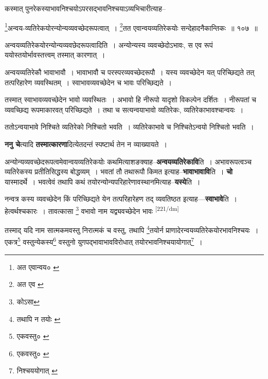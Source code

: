 \documentclass[article,12pt,a4paper]{memoir}
\begin{document}
	  \pstart कस्मात् पुनरेकस्याभावनिश्चयोऽपरसद्भावनिश्चयाऽव्यभिचारीत्याह--
	\pend
       

	  \pstart \footnote{अत एवान्वय० \cite{dp-msC}}अन्वय-व्यतिरेकयोरन्योन्यव्यवच्छेदरूपत्वात् । \footnote{अत एव \cite{dp-msD} \cite{dp-msB} \cite{dp-edP} \cite{dp-edH} \cite{dp-edE} \cite{dp-edN}}तत एवान्वयव्यतिरेकयोः सन्देहादनैकान्तिकः ॥ १०७ ॥
	\pend
       

	  \pstart अन्वयव्यतिरेकयोरन्योन्यव्यवछेदरूपत्वादिति । अन्योन्यस्य व्यवच्छेदोऽभावः, स एव रूपं ययोस्तयोर्भावस्तत्त्वम् तस्मात् कारणात् ।
	\pend
       

	  \pstart अन्वयव्यतिरेकौ भावाभावौ । भावाभावौ च परस्परव्यवच्छेदरूपौ । यस्य व्यवच्छेदेन यत् परिच्छिद्यते तत् तत्परिहारेण व्यवस्थितम् । स्वाभावव्यवच्छेदेन च भावः परिच्छिद्यते ।
	\pend
       

	  \pstart तस्मात् स्वाभावव्यवच्छेदेन भावो व्यवस्थितः । अभावो हि नीरूपो यादृशो विकल्पेन दर्शितः । नीरूपतां च व्यवच्छिद्य रूपमाकारवत् परिच्छिद्यते । तथा च सत्यन्वयाभावो व्यतिरेकः, व्यतिरेकाभावश्चान्वयः ।
	\pend
       

	  \pstart ततोऽन्वयाभावे निश्चिते व्यतिरेको निश्चितो भवति । व्यतिरेकाभावे च निश्चितेऽन्वयो निश्चितो भवति ।
	\pend
      

	  \pstart \textbf{ननु चे}त्यादि \textbf{तस्मात्कारणा}दित्येतदन्तं स्पष्टार्थ तेन न व्याख्यायते ।
	\pend
      

	  \pstart अन्योन्यव्यवच्छेदरूपत्वमेवान्वयव्यतिरेकयोः कथमित्याशङक्याह--\textbf{अन्वयव्यतिरेकावि}ति । अभावरूपत्वञ्च व्यतिरेकस्य प्रतीतिसिद्धस्य बोद्धव्यम् । भवतां तौ तथारूपौ किमत इत्याह--\textbf{भावाभावावि}ति । \textbf{चो} यास्मादर्थे । भवत्वेवं तथापि कथं तयोरन्योन्यपरिहारेणावस्थानमित्याह--\textbf{यस्ये}ति ।
	\pend
      

	  \pstart नन्वत्र कस्य व्यवच्छेदेन किं परिच्छिद्यते येन तत्परिहारेहण तद् व्यवतिष्ठत इत्याह—\textbf{स्वाभावे}ति । हेत्वर्थश्चकारः । तावत्कासा \footnote{कोऽसा} वभावो नाम यद्व्यवच्छेदेन भावः  \leavevmode\textsuperscript{\rmlatinfont\tiny [221/dm]} 
	  
	तस्माद् यदि नाम सात्मकमवस्तु निरात्मकं च वस्तु, तथापि \footnote{तथापि न तयोः \cite{dp-msA} \cite{dp-msB} \cite{dp-edP} \cite{dp-edH} \cite{dp-edE} \cite{dp-edN}}तयोर्न प्राणादेरन्वयव्यतिरेकयोरभावनिश्चयः । एकत्र\footnote{एकवस्तु० \cite{dp-msA} \cite{dp-msB} \cite{dp-edP} \cite{dp-edH} \cite{dp-edE} \cite{dp-edN}} वस्तुन्येकस्य\footnote{एकवस्तु० \cite{dp-msA} \cite{dp-msB} \cite{dp-edP} \cite{dp-edH} \cite{dp-edE} \cite{dp-edN}} वस्तुनो युगपद्भावाभावविरोधात् तयोरभावनिश्चयायोगात्\footnote{निश्चययोगात् \cite{dp-msB}} । 
	  
\end{document}
